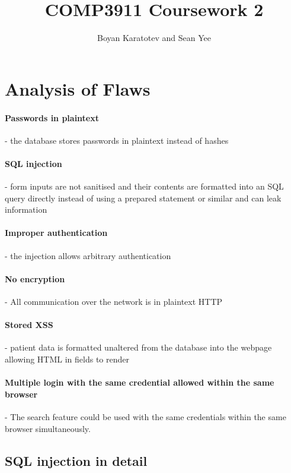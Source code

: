 \documentclass[10pt]{article}
\title{COMP3911 Coursework 2}
\author{Boyan Karatotev and Sean Yee}
\date{}
\begin{document}
    \maketitle

    \section{Analysis of Flaws}

        \paragraph{Passwords in plaintext} - the database stores passwords in
        plaintext instead of hashes

        \paragraph{SQL injection} - form inputs are not sanitised and their
        contents are formatted into an SQL query directly instead of using a
        prepared statement or similar and can leak information

        \paragraph{Improper authentication} - the injection allows arbitrary
        authentication

        \paragraph{No encryption} - All communication over the network is in
        plaintext HTTP

        \paragraph{Stored XSS} - patient data is formatted unaltered from the
        database into the webpage allowing HTML in fields to render

        \paragraph{Multiple login with the same credential allowed within the same browser} - The search feature could be used with the same credentials within the same browser simultaneously.


        \subsection{SQL injection in detail}
\end{document}
